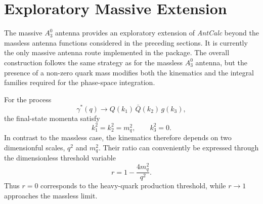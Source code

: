 \section{Exploratory Massive Extension}\label{sec:massiveA30}

The massive $A_3^0$ antenna provides an exploratory extension of \textit{AntCalc} beyond the
massless antenna functions considered in the preceding sections. It is currently the only
massive antenna route implemented in the package. The overall construction follows the same
strategy as for the massless $A_3^0$ antenna, but the presence of a non-zero quark mass
modifies both the kinematics and the integral families required for the phase-space
integration.

For the process
\begin{equation*}
    \gamma^*(q)\rightarrow Q(k_1)\,\bar Q(k_2)\,g(k_3),
\end{equation*}
the final-state momenta satisfy
\begin{equation*}
    k_1^2=k_2^2=m_q^2,\qquad k_3^2=0.
\end{equation*}
In contrast to the massless case, the kinematics therefore depends on two dimensionful scales,
$q^2$ and $m_q^2$. Their ratio can conveniently be expressed through the dimensionless
threshold variable
\begin{equation}\label{eq:thresholdr}
    r = 1 - \frac{4m_q^2}{q^2}.
\end{equation}
Thus $r=0$ corresponds to the heavy-quark production threshold, while $r\to1$ approaches the
massless limit.

